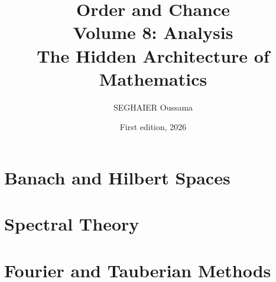 \documentclass[11pt,openany]{book}
\title{\Huge\textbf{Order and Chance}\\[0.4em]\LARGE Volume 8: Analysis\\[0.6em]
\Large The Hidden Architecture of Mathematics}
\author{SEGHAIER Oussama}
\date{First edition, 2026}
\begin{document}
\frontmatter
\makecover
\maketitle

\tableofcontents

\mainmatter

\part{Banach and Hilbert Spaces}


\part{Spectral Theory}







\part{Fourier and Tauberian Methods}








\appendix







\end{document}
